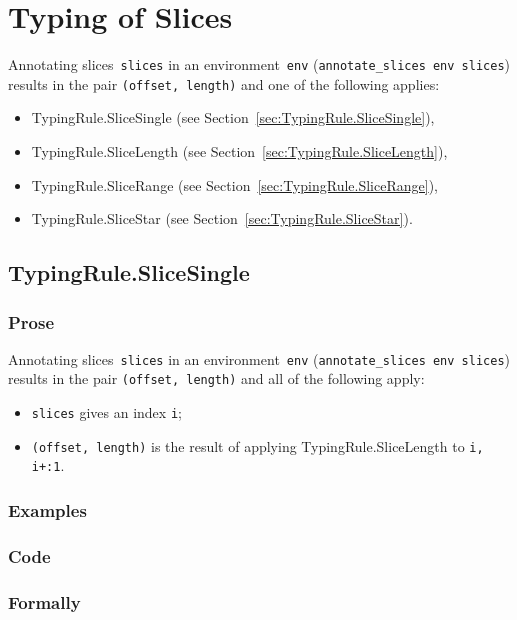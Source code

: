 \documentclass{book}
\begin{document}
\chapter{Typing of Slices}
Annotating slices~\texttt{slices} in an environment~\texttt{env}
(\texttt{annotate\_slices env slices}) results in the pair \texttt{(offset,
length)} and one of the following applies:
\begin{itemize}
\item TypingRule.SliceSingle (see Section~\ref{sec:TypingRule.SliceSingle}),
\item TypingRule.SliceLength (see Section~\ref{sec:TypingRule.SliceLength}),
\item TypingRule.SliceRange (see Section~\ref{sec:TypingRule.SliceRange}),
\item TypingRule.SliceStar (see Section~\ref{sec:TypingRule.SliceStar}).
\end{itemize}

\section{TypingRule.SliceSingle \label{sec:TypingRule.SliceSingle}}

  \subsection{Prose}
   Annotating slices~\texttt{slices} in an environment~\texttt{env}
(\texttt{annotate\_slices env slices}) results in the pair \texttt{(offset,
length)} and all of the following apply: 
   \begin{itemize}
   \item \texttt{slices} gives an index \texttt{i};
   \item \texttt{(offset, length)} is the result of applying TypingRule.SliceLength to \texttt{i, i+:1}.
   \end{itemize}

  \subsection{Examples}

  \subsection{Code}

  \subsection{Formally}
\end{document}
